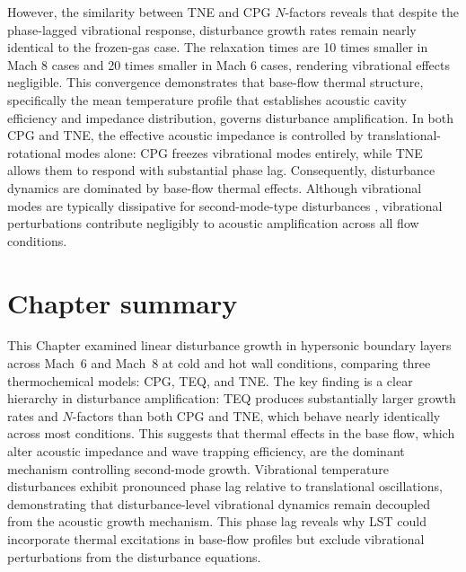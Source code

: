 However, the similarity between \gls{TNE} and \gls{CPG} $N$-factors reveals that despite the phase-lagged vibrational response, disturbance growth rates remain nearly identical to the frozen-gas case. The relaxation times are 10 times smaller in Mach 8 cases and 20 times smaller in Mach 6 cases, rendering vibrational effects negligible. This convergence demonstrates that base-flow thermal structure, specifically the mean temperature profile that establishes acoustic cavity efficiency and impedance distribution, governs disturbance amplification. In both \gls{CPG} and \gls{TNE}, the effective acoustic impedance is controlled by translational-rotational modes alone: \gls{CPG} freezes vibrational modes entirely, while \gls{TNE} allows them to respond with substantial phase lag. Consequently, disturbance dynamics are dominated by base-flow thermal effects. Although vibrational modes are typically dissipative for second-mode-type disturbances \citep{Wagnild2012,BitterShepherd2015}, vibrational perturbations contribute negligibly to acoustic amplification across all flow conditions.

\section*{Chapter summary}
This Chapter examined linear disturbance growth in hypersonic boundary layers across Mach~6 and Mach~8 at cold and hot wall conditions, comparing three thermochemical models: \gls{CPG}, \gls{TEQ}, and \gls{TNE}. The key finding is a clear hierarchy in disturbance amplification: \gls{TEQ} produces substantially larger growth rates and $N$-factors than both \gls{CPG} and \gls{TNE}, which behave nearly identically across most conditions. This suggests that thermal effects in the base flow, which alter acoustic impedance and wave trapping efficiency, are the dominant mechanism controlling second-mode growth. Vibrational temperature disturbances exhibit pronounced phase lag relative to translational oscillations, demonstrating that disturbance-level vibrational dynamics remain decoupled from the acoustic growth mechanism. This phase lag reveals why \gls{LST} could incorporate thermal excitations in base-flow profiles but exclude vibrational perturbations from the disturbance equations.

